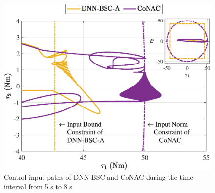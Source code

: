 \documentclass[lettersize,journal]{IEEEtran}
\begin{document}
\begin{figure}[!t]
    \centering
    {\includegraphics[width=0.9\linewidth]{fig16.eps}
    \caption{Control input paths of DNN-BSC and CoNAC during the time interval from 5 s to 8 s.}
    \label{fig: ball control}}
\end{figure}
\end{document}
